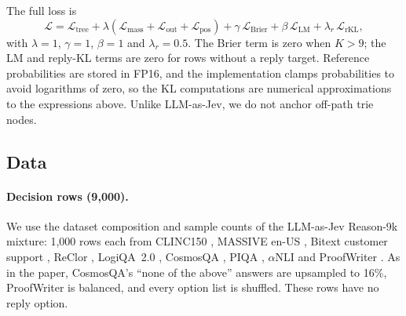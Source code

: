 \documentclass[11pt]{article}
\begin{document}
The full loss is
\begin{equation}
\mathcal{L}=\mathcal{L}_{\text{tree}}+\lambda\left(\mathcal{L}_{\text{mass}}+\mathcal{L}_{\text{out}}+\mathcal{L}_{\text{pos}}\right)+\gamma\,\mathcal{L}_{\text{Brier}}+\beta\,\mathcal{L}_{\text{LM}}+\lambda_r\,\mathcal{L}_{\text{rKL}},
\end{equation}
with $\lambda=1$, $\gamma=1$, $\beta=1$ and $\lambda_r=0.5$. The Brier term is zero when $K>9$; the LM and reply-KL terms are zero for rows without a reply target. Reference probabilities are stored in FP16, and the implementation clamps probabilities to avoid logarithms of zero, so the KL computations are numerical approximations to the expressions above. Unlike LLM-as-Jev, we do not anchor off-path trie nodes.

\subsection{Data}
\paragraph{Decision rows (9{,}000).} We use the dataset composition and sample counts of the LLM-as-Jev Reason-9k mixture: 1{,}000 rows each from CLINC150 \citep{larson2019clinc}, MASSIVE en-US \citep{fitzgerald2023massive}, Bitext customer support \citep{bitext2024}, ReClor \citep{yu2020reclor}, LogiQA~2.0 \citep{liu2023logiqa2}, CosmosQA \citep{huang2019cosmosqa}, PIQA \citep{bisk2020piqa}, $\alpha$NLI \citep{bhagavatula2020anli} and ProofWriter \citep{tafjord2021proofwriter}. As in the paper, CosmosQA's ``none of the above'' answers are upsampled to 16\%, ProofWriter is balanced, and every option list is shuffled. These rows have no reply option.
\end{document}
